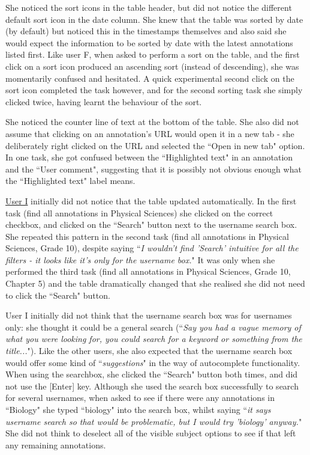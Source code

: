 She noticed the sort icons in the table header, but did not notice the different default sort icon in the date column. She knew that the table was sorted by date (by default) but noticed this in the timestamps themselves and also said she would expect the information to be sorted by date with the latest annotations listed first. Like user F, when asked to perform a sort on the table, and the first click on a sort icon produced an ascending sort (instead of descending), she was momentarily confused and hesitated. A quick experimental second click on the sort icon completed the task however, and for the second sorting task she simply clicked twice, having learnt the behaviour of the sort. 

She noticed the counter line of text at the bottom of the table. She also did not assume that clicking on an annotation's URL would open it in a new tab - she deliberately right clicked on the URL and selected the ``Open in new tab" option. In one task, she got confused between the ``Highlighted text" in an annotation and the ``User comment", suggesting that it is possibly not obvious enough what the ``Highlighted text" label means. 

\underline{User I} initially did not notice that the table updated automatically. In the first task (find all annotations in Physical Sciences) she clicked on the correct checkbox, and clicked on the ``Search" button next to the username search box. She repeated this pattern in the second task (find all annotations in Physical Sciences, Grade 10), despite saying ``\textit{I wouldn't find 'Search' intuitive for all the filters - it looks like it's only for the username box.}" It was only when she performed the third task (find all annotations in Physical Sciences, Grade 10, Chapter 5) and the table dramatically changed that she realised she did not need to click the ``Search" button.  

User I initially did not think that the username search box was for usernames only: she thought it could be a general search (``\textit{Say you had a vague memory of what you were looking for, you could search for a keyword or something from the title...}"). Like the other users, she also expected that the username search box would offer some kind of ``\textit{suggestions}" in the way of autocomplete functionality. When using the searchbox, she clicked the ``Search" button both times, and did not use the [Enter] key. Although she used the search box successfully to search for several usernames, when asked to see if there were any annotations in ``Biology" she typed ``biology" into the search box, whilst saying ``\textit{it says username search so that would be problematic, but I would try 'biology' anyway.}" She did not think to deselect all of the visible subject options to see if that left any remaining annotations. 

